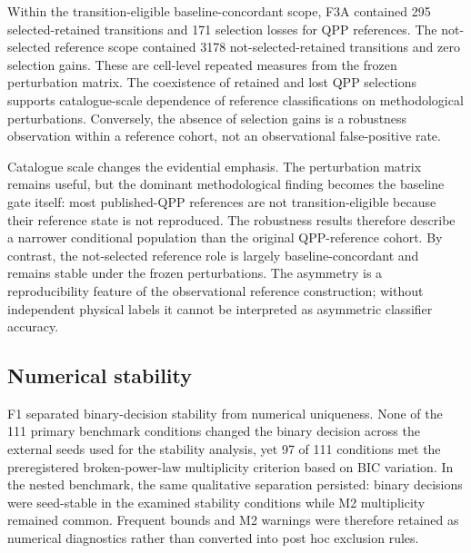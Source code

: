 \documentclass[11pt,a4paper]{article}
\begin{document}
Within the transition-eligible baseline-concordant scope, F3A contained 295 selected-retained transitions and 171 selection losses for QPP references. The not-selected reference scope contained 3178 not-selected-retained transitions and zero selection gains. These are cell-level repeated measures from the frozen perturbation matrix. The coexistence of retained and lost QPP selections supports catalogue-scale dependence of reference classifications on methodological perturbations. Conversely, the absence of selection gains is a robustness observation within a reference cohort, not an observational false-positive rate.





Catalogue scale changes the evidential emphasis. The perturbation matrix remains useful, but the dominant methodological finding becomes the baseline gate itself: most published-QPP references are not transition-eligible because their reference state is not reproduced. The robustness results therefore describe a narrower conditional population than the original QPP-reference cohort. By contrast, the not-selected reference role is largely baseline-concordant and remains stable under the frozen perturbations. The asymmetry is a reproducibility feature of the observational reference construction; without independent physical labels it cannot be interpreted as asymmetric classifier accuracy.

\subsection{Numerical stability}
F1 separated binary-decision stability from numerical uniqueness. None of the 111 primary benchmark conditions changed the binary decision across the external seeds used for the stability analysis, yet 97 of 111 conditions met the preregistered broken-power-law multiplicity criterion based on BIC variation. In the nested benchmark, the same qualitative separation persisted: binary decisions were seed-stable in the examined stability conditions while M2 multiplicity remained common. Frequent bounds and M2 warnings were therefore retained as numerical diagnostics rather than converted into post hoc exclusion rules.
\end{document}

